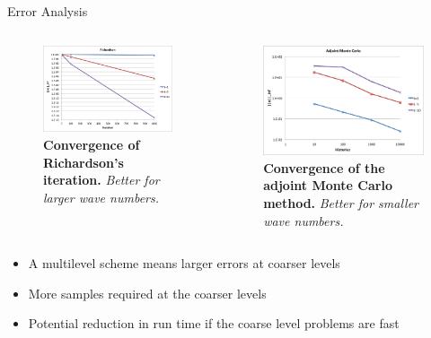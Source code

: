 \documentclass{beamer}
\begin{document}
\begin{frame}{Error Analysis}

  \begin{columns}

    \begin{column}{0.5\textwidth}
      \begin{figure}[h!]
        \begin{center}
          \includegraphics[width=2in]{richardson.png}
        \end{center}
        \caption{\textbf{Convergence of Richardson's iteration.}
          \textit{Better for larger wave numbers.}}
        \label{fig:richardson}
      \end{figure}
    \end{column}

    \begin{column}{0.5\textwidth}
      \begin{figure}[h!]
        \begin{center}
          \includegraphics[width=2in]{adjoint_mc.png}
        \end{center}
        \caption{\textbf{Convergence of the adjoint Monte Carlo
            method.} \textit{Better for smaller wave numbers.} }
        \label{fig:adjoint_mc}
      \end{figure}
    \end{column}

  \end{columns}

  \begin{itemize}
    \item A multilevel scheme means larger errors at coarser levels
    \item More samples required at the coarser levels
    \item Potential reduction in run time if the coarse level problems
      are fast
  \end{itemize}

\end{frame}
\end{document}
